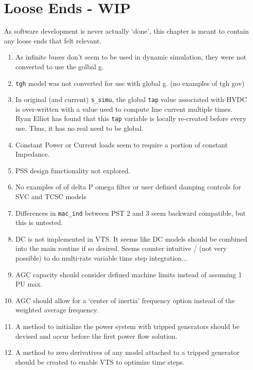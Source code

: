 \chapter{Loose Ends - WIP}
As software development is never actually `done', this chapter is meant to contain any loose ends that felt relevant.

\begin{enumerate}
\singlespacing
{} em
	\item As infinite buses don't seem to be used in dynamic simulation, they were not converted to use the golbal g.
	\item \verb|tgh| model was not converted for use with global g. (no examples of tgh gov)
	\item In original (and current) \verb|s_simu|, the global \verb|tap| value associated with HVDC is over-written with  a value used to compute line current multiple times. \\Ryan Elliot has found that this \verb|tap| variable is locally re-created before every use. Thus, it has no real need to be global.
	\item Constant Power or Current loads seem to require a portion of constant Impedance.
	\item PSS design functionality not explored.
	\item No examples of of delta P omega filter or user defined damping controls for SVC and TCSC models
	\item Differences in \verb|mac_ind| between PST 2 and 3 seem backward compatible, but this is untested.
	\item DC is not implemented in VTS. It seems like DC models should be combined into the main routine if so desired. Seems counter intuitive / (not very possible) to do multi-rate variable time step integration...
	\item AGC capacity should consider defined machine limits instead of assuming 1 PU max.
	\item AGC should allow for a `center of inertia' frequency option instead of the weighted average frequency.
	\item A method to initialize the power system with tripped generators should be devised and occur before the first power flow solution.
	\item A method to zero derivatives of any model attached to a tripped generator should be created to enable VTS to optimize time steps.

\end{enumerate}
